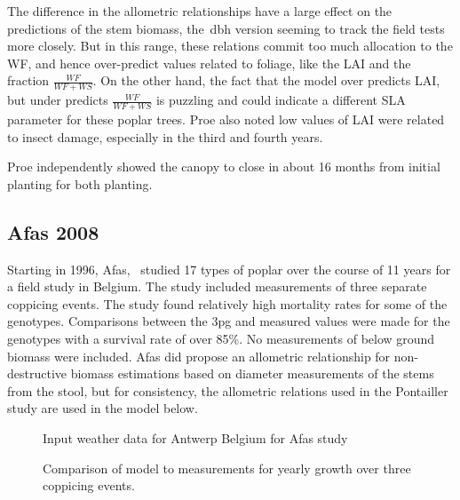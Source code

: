 \documentclass[10pt]{article}
\begin{document}
The difference in the allometric relationships have a large effect on the
predictions of the stem biomass, the~\ac{dbh} version seeming to track the field
tests more closely.  But in this range, these relations commit too much
allocation to the \ac{WF}, and hence over-predict values related to foliage,
like the \ac{LAI} and the fraction $\frac{WF}{WF+WS}$.  On the other hand, the
fact that the model over predicts \ac{LAI}, but under predicts
$\frac{WF}{WF+WS}$ is puzzling and could indicate a different \ac{SLA} parameter
for these poplar trees.  Proe also noted low values of \ac{LAI} were related to
insect damage, especially in the third and fourth years.

Proe independently showed the canopy to close in about 16 months from initial
planting for both planting.  


\subsection*{Afas 2008}
\label{afas2008}

Starting in 1996, Afas,~\cite{Afas2008a} studied 17 types of poplar over the
course of 11 years for a field study in Belgium.  The study included
measurements of three separate coppicing events.  The study found relatively
high mortality rates for some of the genotypes.  Comparisons between the
\ac{3pg} and measured values were made for the genotypes with a survival rate of
over 85\%.  No measurements of below ground biomass were included.  Afas did
propose an allometric relationship for non-destructive biomass estimations based
on diameter measurements of the stems from the stool, but for consistency, the
allometric relations used in the Pontailler study are used in the model below.

\begin{figure}
  \centering
  
  \caption{Input weather data for Antwerp Belgium for Afas study}
  \label{fig:afras-weather}
\end{figure}


    

\begin{figure}[!ht]
  \centering
  
  \caption{Comparison of model to measurements for yearly growth over three
    coppicing events.}
\label{fig:afas-biomass}
\end{figure}
\end{document}
